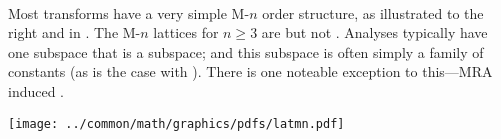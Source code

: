 \mbox{}\\
\begin{minipage}{\tw-65mm}%
  Most transforms have a very simple M-$n$ order structure,
  as illustrated to the right and in .
  The M-$n$ lattices for $n\ge3$ are  but not .
  Analyses typically have one subspace that is a  subspace;
  and this subspace is often simply a family of constants
  (as is the case with ).
  There is one noteable exception to this---MRA induced  .
\end{minipage}%
\hfill%
{\begin{minipage}{60mm}%
  \begin{center}
  \texttt{[image: ../common/math/graphics/pdfs/latmn.pdf]}%
  \end{center}
\end{minipage}}



